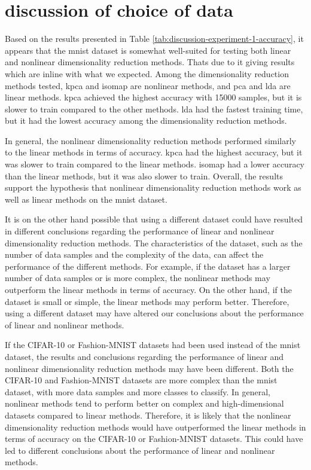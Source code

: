 \section{discussion of choice of data}
Based on the results presented in Table \ref{tab:discussion-experiment-1-accuracy}, it appears that the \gls{mnist} dataset is somewhat well-suited for testing both linear and nonlinear dimensionality reduction methods. Thats due to it giving results which are inline with what we expected. Among the dimensionality reduction methods tested, \gls{kpca} and \gls{isomap} are nonlinear methods, and \gls{pca} and \gls{lda} are linear methods. \gls{kpca} achieved the highest accuracy with 15000 samples, but it is slower to train compared to the other methods. \gls{lda} had the fastest training time, but it had the lowest accuracy among the dimensionality reduction methods.

In general, the nonlinear dimensionality reduction methods performed similarly to the linear methods in terms of accuracy. \gls{kpca} had the highest accuracy, but it was slower to train compared to the linear methods. \gls{isomap} had a lower accuracy than the linear methods, but it was also slower to train. Overall, the results support the hypothesis that nonlinear dimensionality reduction methods work as well as linear methods on the \gls{mnist} dataset.

It is on the other hand possible that using a different dataset could have resulted in different conclusions regarding the performance of linear and nonlinear dimensionality reduction methods. The characteristics of the dataset, such as the number of data samples and the complexity of the data, can affect the performance of the different methods. For example, if the dataset has a larger number of data samples or is more complex, the nonlinear methods may outperform the linear methods in terms of accuracy. On the other hand, if the dataset is small or simple, the linear methods may perform better. Therefore, using a different dataset may have altered our conclusions about the performance of linear and nonlinear methods.

If the CIFAR-10 or Fashion-MNIST datasets had been used instead of the \gls{mnist} dataset, the results and conclusions regarding the performance of linear and nonlinear dimensionality reduction methods may have been different. Both the CIFAR-10 and Fashion-MNIST datasets are more complex than the \gls{mnist} dataset, with more data samples and more classes to classify. In general, nonlinear methods tend to perform better on complex and high-dimensional datasets compared to linear methods. Therefore, it is likely that the nonlinear dimensionality reduction methods would have outperformed the linear methods in terms of accuracy on the CIFAR-10 or Fashion-MNIST datasets. This could have led to different conclusions about the performance of linear and nonlinear methods.


